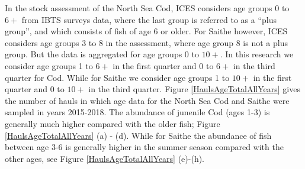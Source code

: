 \documentclass[a4paper 12pt]{article}
\numberwithin{equation}{section}
\begin{document}
In the stock assessment of the North Sea Cod,  ICES considers age groups 0 to $6+$ from IBTS surveys data, where the last group is referred to as a ``plus group'', and which consists of fish of age 6 or older. For Saithe however, ICES considers age groups 3 to 8 in the assessment, where age group 8 is not a plus group. But the data is aggregated for age groups 0 to $10+$. In this research we consider age groups 1 to $6+$ in the first quarter and 0 to $6+$ in the third quarter for Cod. While for Saithe we consider age groups 1 to $10+$ in the first quarter and  0 to $10+$ in the third quarter. Figure \ref{HaulsAgeTotalAllYears} gives the number of hauls in which age data for the North Sea Cod and Saithe were sampled in years 2015-2018. The abundance of junenile Cod (ages 1-3) is generally much higher  compared with the older fish; Figure \ref{HaulsAgeTotalAllYears} (a) - (d). While for Saithe the abundance of fish between age 3-6 is generally higher in the summer season compared with the other ages, see Figure \ref{HaulsAgeTotalAllYears} (e)-(h). 
\end{document}
